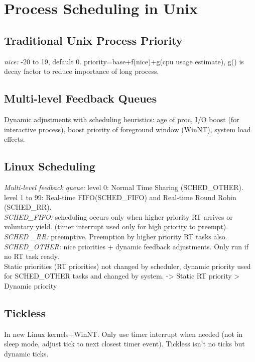 \section{Process Scheduling in Unix}
\subsection*{Traditional Unix Process Priority}
\emph{nice:} -20 to 19, default 0. priority=base+f(nice)+g(cpu usage estimate), g() is decay factor to reduce importance of long process.

\subsection*{Multi-level Feedback Queues}
Dynamic adjustments with scheduling heuristics: age of proc, I/O boost (for interactive process), boost priority of foreground window (WinNT), system load effects.

\subsection*{Linux Scheduling}
\emph{Multi-level feedback queue:} level 0: Normal Time Sharing (SCHED\_OTHER). level 1 to 99: Real-time FIFO(SCHED\_FIFO) and Real-time Round Robin (SCHED\_RR).\\
\emph{SCHED\_FIFO:} scheduling occurs only when higher priority RT arrives or voluntary yield. (timer interrupt used only for high priority to preempt).\\
\emph{SCHED \_RR:} preemptive. Preemption by higher priority RT tasks also.\\
\emph{SCHED\_OTHER:} nice priorities + dynamic feedback adjustments. Only run if no RT task ready.\\
Static priorities (RT priorities) not changed by scheduler, dynamic priority used for SCHED\_OTHER tasks and changed by system. -> Static RT priority > Dynamic priority

\subsection*{Tickless}
In new Linux kernels+WinNT. Only use timer interrupt when needed (not in sleep mode, adjust tick to next closest timer event). Tickless isn't no ticks but dynamic ticks.